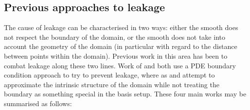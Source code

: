 \subsection{Previous approaches to leakage}

The cause of leakage can be characterised in two ways: either the smooth does not respect the boundary of the domain, or the smooth does not take into account the geometry of the domain (in particular with regard to the distance between points within the domain). Previous work in this area has been to combat leakage along these two lines. Work of \cite{ramsay} and \cite{soap} both use a PDE boundary condition approach to try to prevent leakage, where as \cite{wangranalli} and \cite{eilerstalk}  attempt to approximate the intrinsic structure of the domain while not treating the boundary as something special in the basis setup. These four main works may be summarised as follows:

